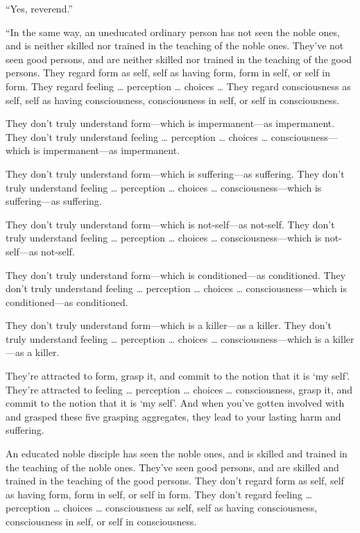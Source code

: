 \documentclass[12pt,openany]{book}%
\begin{document}
“Yes, reverend.” 

“In the same way, an uneducated ordinary person has not seen the noble ones, and is neither skilled nor trained in the teaching of the noble ones. They’ve not seen good persons, and are neither skilled nor trained in the teaching of the good persons. They regard form as self, self as having form, form in self, or self in form. They regard feeling … perception … choices … They regard consciousness as self, self as having consciousness, consciousness in self, or self in consciousness. 

They don’t truly understand form—which is impermanent—as impermanent. They don’t truly understand feeling … perception … choices … consciousness—which is impermanent—as impermanent. 

They don’t truly understand form—which is suffering—as suffering. They don’t truly understand feeling … perception … choices … consciousness—which is suffering—as suffering. 

They don’t truly understand form—which is not-self—as not-self. They don’t truly understand feeling … perception … choices … consciousness—which is not-self—as not-self. 

They don’t truly understand form—which is conditioned—as conditioned. They don’t truly understand feeling … perception … choices … consciousness—which is conditioned—as conditioned. 

They don’t truly understand form—which is a killer—as a killer. They don’t truly understand feeling … perception … choices … consciousness—which is a killer—as a killer. 

They’re attracted to form, grasp it, and commit to the notion that it is ‘my self’. They’re attracted to feeling … perception … choices … consciousness, grasp it, and commit to the notion that it is ‘my self’. And when you’ve gotten involved with and grasped these five grasping aggregates, they lead to your lasting harm and suffering. 

An educated noble disciple has seen the noble ones, and is skilled and trained in the teaching of the noble ones. They’ve seen good persons, and are skilled and trained in the teaching of the good persons. They don’t regard form as self, self as having form, form in self, or self in form. They don’t regard feeling … perception … choices … consciousness as self, self as having consciousness, consciousness in self, or self in consciousness. 
\end{document}

